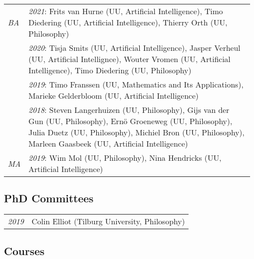 \begin{tabular}{p{.1\linewidth} p{.8\linewidth}}
  \emph{BA}  & \emph{2021}: Frits van Hurne (UU, Artificial Intelligence),
                            Timo Diedering (UU, Artificial Intelligence),
                            Thierry Orth (UU, Philosophy)\\

             & \emph{2020}: Tisja Smits (UU, Artificial Intelligence),
                            Jasper Verheul (UU, Artificial Intellignce),
                            Wouter Vromen (UU, Artificial Intelligence),
                            Timo Diedering (UU, Philosophy)\\
             & \emph{2019}: Timo Franssen (UU, Mathematics and Its
                            Applications), Marieke Gelderbloom (UU, Artificial Intelligence)\\
             & \emph{2018}: Steven Langerhuizen (UU, Philosophy), Gijs van der
                            Gun (UU, Philosophy), Ern\"o Groeneweg (UU, Philosophy), Julia Duetz (UU,
                            Philosophy), Michiel Bron (UU, Philosophy), Marleen Gaasbeek (UU, Artificial
                            Intelligence)\\[1ex]
  \emph{MA}  & \emph{2019}: Wim Mol (UU, Philosophy),
                            Nina Hendricks (UU, Artificial Intelligence)\\
\end{tabular}

\subsection*{PhD Committees}

\begin{tabular}{p{.1\linewidth} p{.8\linewidth}}
  \emph{2019} & Colin Elliot (Tilburg University, Philosophy)\\
\end{tabular}

\subsection*{Courses}

